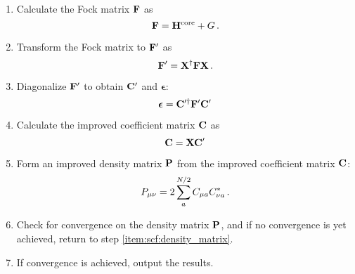 \documentclass[12pt]{article}
\begin{document}
\begin{enumerate}
        \item Calculate the Fock matrix $\vb{F}$ as
        \begin{equation}
            \vb{F} = \vb{H}^\text{core} + G \thinspace .
        \end{equation}

        \item Transform the Fock matrix to $\vb{F}'$ as
        \begin{equation}
            \vb{F}' = \vb{X}^\dagger \vb{F} \vb{X} \thinspace .
        \end{equation}

        \item Diagonalize $\vb{F}'$ to obtain $\vb{C}'$ and $\boldsymbol{\epsilon}$:
        \begin{equation}
            \boldsymbol{\epsilon} = \vb{C}'^\dagger \vb{F}' \vb{C}'
        \end{equation}

        \item Calculate the improved coefficient matrix $\vb{C}$ as
        \begin{equation}
            \vb{C} = \vb{X} \vb{C}'
        \end{equation}

        \item Form an improved density matrix $\vb{P}$ from the improved coefficient matrix $\vb{C}$:
        \begin{equation}
            P_{\mu \nu} = 2 \sum_a^{N/2} C_{\mu a} C^*_{\nu a} \thinspace .
        \end{equation}

        \item Check for convergence on the density matrix $\vb{P}$, and if no convergence is yet achieved, return to step \ref{item:scf:density_matrix}.

        \item If convergence is achieved, output the results.
    \end{enumerate}






\end{document}
